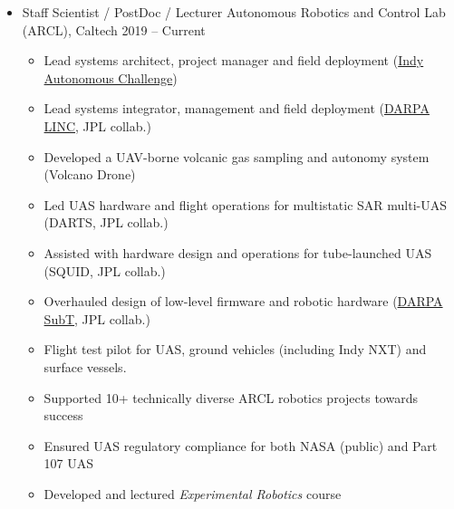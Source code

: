 \documentclass[12pt,letter,sans]{moderncv}        %
\begin{document}
\begin{itemize}

\item{\cventry
    {}
    {Staff Scientist / PostDoc / Lecturer}
    {Autonomous Robotics and Control Lab (ARCL), Caltech}
    {2019 -- Current}
	{}
	{ 
        \vspace{3pt} 
        \begin{itemize}
			\item Lead systems architect, project manager and field deployment (\href{https://www.indyautonomouschallenge.com/california-institute-of-technology-joins-the-indy-autonomous-challenge}{Indy Autonomous Challenge})            
            \item Lead systems integrator, management and field deployment (\href{https://www.darpa.mil/news-events/2024-3-7}{DARPA LINC}, JPL collab.)
            \item Developed a UAV-borne volcanic gas sampling and autonomy system (Volcano Drone)%
            \item Led UAS hardware and flight operations for multistatic SAR multi-UAS (DARTS, JPL collab.) %
            \item Assisted with hardware design and operations for tube-launched UAS (SQUID, JPL collab.)
            \item Overhauled design of low-level firmware and robotic hardware (\href{https://www.darpa.mil/program/darpa-subterranean-challenge}{DARPA SubT}, JPL collab.)
            \item Flight test pilot for UAS, ground vehicles (including Indy NXT) and surface vessels.
            \item Supported 10+ technically diverse ARCL robotics projects towards success
            \item Ensured UAS regulatory compliance for both NASA (public) and Part 107 UAS
            \item Developed and lectured \textit{Experimental Robotics} course %
        \end{itemize}
    }
}


\end{itemize}
\end{document}
